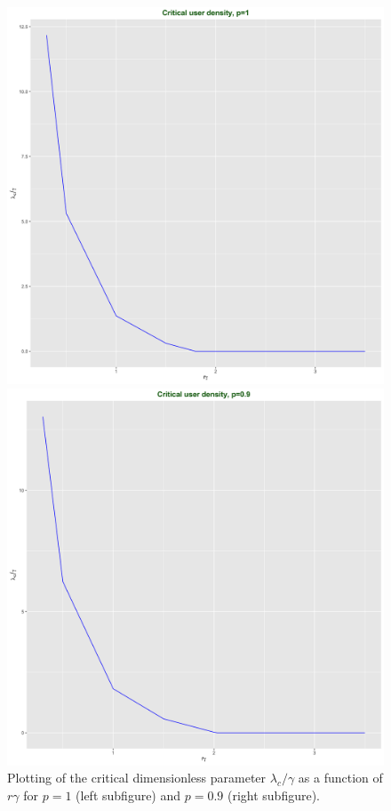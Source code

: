 \documentclass[conference]{IEEEtran}
\begin{document}
\begin{figure}[t!]
\centering
\begin{minipage}{0.5\textwidth}
  \centering
  \includegraphics[width=\textwidth]{Figures/critical-lambda-p_1.png}
\end{minipage}%
\begin{minipage}{0.5\textwidth}
  \centering
  \includegraphics[width=\textwidth]{Figures/critical-lambda-p_0_9.png}
\end{minipage}
\caption{Plotting of the critical dimensionless parameter $\lambda_{c}/ \gamma$ as a function of $r\gamma$ for $p=1$ (left subfigure) and $p=0.9$ (right subfigure). \label{critical-density-comparison}}
\end{figure}
\end{document}
